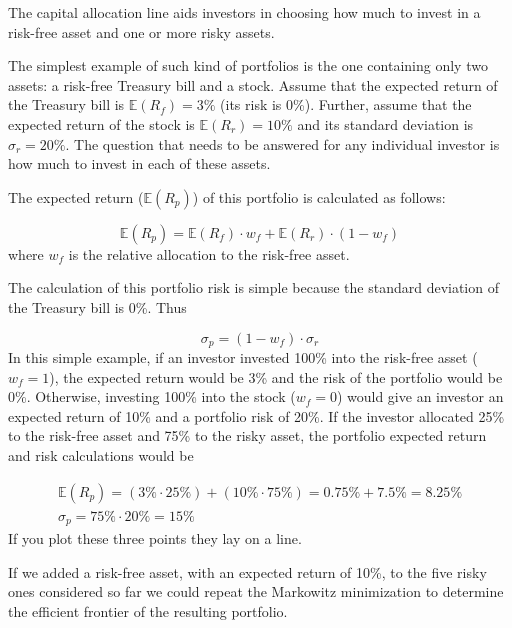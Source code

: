 The capital allocation line aids investors in choosing how much to invest in a risk-free asset and one or more risky assets.

The simplest example of such kind of portfolios is the one containing only two assets: a risk-free Treasury bill and a stock. Assume that the expected return of the Treasury bill is \(\mathbb{E}(R_f)=3\%\) (its risk is 0\%). Further, assume that the expected return of the stock is \(\mathbb{E}(R_r)=10\%\) and its standard deviation is \(\sigma_r=20\%\). The question that needs to be answered for any individual investor is how much to invest in each of these assets.

The expected return (\(\mathbb{E}(R_p)\)) of this portfolio is calculated as follows:

\begin{equation*} 
\mathbb{E}(R_p) = \mathbb{E}(R_f)\cdot w_f + \mathbb{E}(R_r)\cdot (1- w_f) 
\end{equation*}
where \(w_f\) is the relative allocation to the risk-free asset.

The calculation of this portfolio risk is simple because the standard deviation of the Treasury bill is 0\%. Thus

\begin{equation*} 
\sigma_p = (1-w_f)\cdot \sigma_r 
\end{equation*}
In this simple example, if an investor invested 100\% into the risk-free asset (\(w_f=1\)), the expected return would be 3\% and the risk of the portfolio would be 0\%. Otherwise, investing 100\% into the stock (\(w_f=0\)) would give an investor an expected return of 10\% and a portfolio risk of 20\%. If the investor allocated 25\% to the risk-free asset and 75\% to the risky asset, the portfolio expected return and risk calculations would be

\begin{equation*}
\begin{gathered}
\mathbb{E}(R_p) = (3\% \cdot 25\%) + (10\% \cdot 75\%) = 0.75\% + 7.5\% = 8.25\% \\
\sigma_p = 75\% \cdot 20\% = 15\% 
\end{gathered}
\end{equation*}
\noindent
If you plot these three points they lay on a line.

If we added a risk-free asset, with an expected return of 10\%, to the five risky ones considered so far we could repeat the Markowitz minimization to determine the efficient frontier of the resulting portfolio. 

